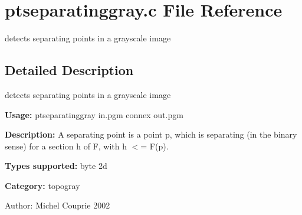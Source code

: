 \section{ptseparatinggray.c File Reference}
\label{ptseparatinggray_8c}
detects separating points in a grayscale image  




\label{_details}
\subsection{Detailed Description}
detects separating points in a grayscale image 

{\bf Usage:} ptseparatinggray in.pgm connex out.pgm

{\bf Description:} A separating point is a point p, which is separating (in the binary sense) for a section h of F, with h $<$= F(p).

{\bf Types supported:} byte 2d

{\bf Category:} topogray

\begin{Desc}
\item[Author:]Michel Couprie 2002 \end{Desc}
